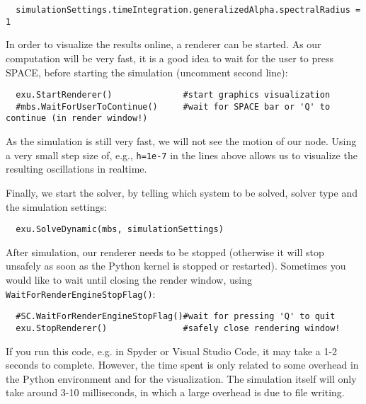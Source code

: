 \pythonstyle\begin{lstlisting}
  simulationSettings.timeIntegration.generalizedAlpha.spectralRadius = 1
\end{lstlisting}
%
In order to visualize the results online, a renderer can be started. As our computation will be very fast, it is a good idea to wait for the user to press SPACE, before starting the simulation (uncomment second line):
\pythonstyle\begin{lstlisting}
  exu.StartRenderer()              #start graphics visualization
  #mbs.WaitForUserToContinue()     #wait for SPACE bar or 'Q' to continue (in render window!)
\end{lstlisting}
As the simulation is still very fast, we will not see the motion of our node. Using a very small step size of, e.g., \texttt{h=1e-7} in the lines above allows us to visualize the resulting oscillations in realtime.

%
Finally, we start the solver, by telling which system to be solved, solver type and the simulation settings:
\pythonstyle\begin{lstlisting}
  exu.SolveDynamic(mbs, simulationSettings)
\end{lstlisting}
%

After simulation, our renderer needs to be stopped (otherwise it will stop unsafely as soon as the Python kernel is stopped or restarted). 
Sometimes you would like to wait until closing the render window, using \texttt{WaitForRenderEngineStopFlag()}:
\pythonstyle\begin{lstlisting}
  #SC.WaitForRenderEngineStopFlag()#wait for pressing 'Q' to quit
  exu.StopRenderer()               #safely close rendering window!
\end{lstlisting}
%
If you run this code, e.g. in Spyder or Visual Studio Code, it may take a 1-2 seconds to complete. However, the time spent is only related to some overhead in the Python environment and for the visualization. The simulation itself will only take around 3-10 milliseconds, in which a large overhead is due to file writing.


